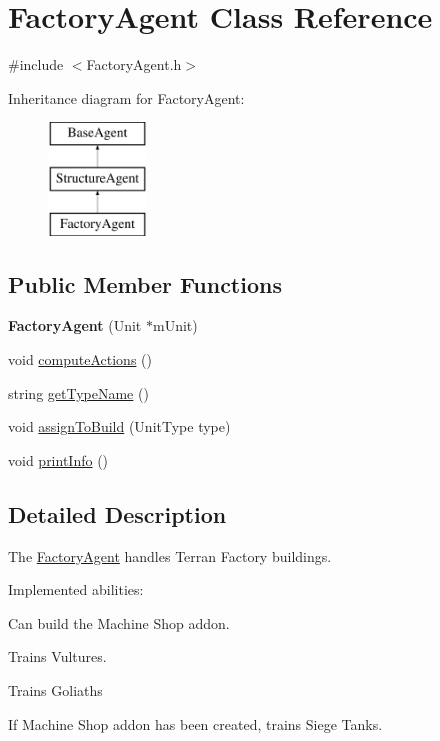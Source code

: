 \hypertarget{class_factory_agent}{
\section{FactoryAgent Class Reference}
\label{class_factory_agent}
}


{\ttfamily \#include $<$FactoryAgent.h$>$}

Inheritance diagram for FactoryAgent:\begin{figure}[H]
\begin{center}
\leavevmode
\includegraphics[height=3.000000cm]{class_factory_agent}
\end{center}
\end{figure}
\subsection*{Public Member Functions}
\begin{DoxyCompactItemize}
\item 
\hypertarget{class_factory_agent_a394c4718ee5e62a9767dddb43500e5bb}{
{\bfseries FactoryAgent} (Unit $\ast$mUnit)}
\label{class_factory_agent_a394c4718ee5e62a9767dddb43500e5bb}

\item 
void \hyperlink{class_factory_agent_a47a75cbb9b94f228360d60bd8be61483}{computeActions} ()
\item 
string \hyperlink{class_factory_agent_a0cab993095a23ec78f932cc580a7ce57}{getTypeName} ()
\item 
void \hyperlink{class_factory_agent_ad3072919567875ea73dce12639e811a7}{assignToBuild} (UnitType type)
\item 
void \hyperlink{class_factory_agent_a7169ea3bb8e8fc4daa2568b879156bc1}{printInfo} ()
\end{DoxyCompactItemize}


\subsection{Detailed Description}
The \hyperlink{class_factory_agent}{FactoryAgent} handles Terran Factory buildings.

Implemented abilities:
\begin{DoxyItemize}
\item Can build the Machine Shop addon.
\item Trains Vultures.
\item Trains Goliaths
\item If Machine Shop addon has been created, trains Siege Tanks.
\end{DoxyItemize}

